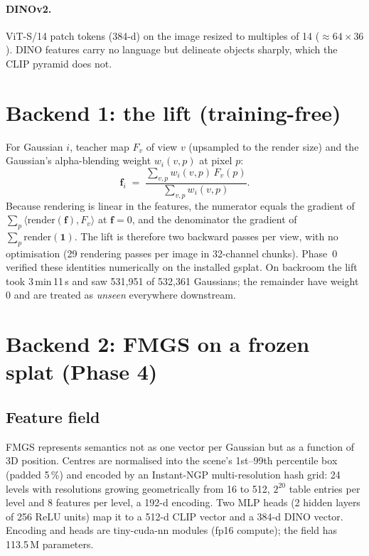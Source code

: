\documentclass[11pt,a4paper]{article}
\newcommand{\vect}[1]{\mathbf{#1}}
\begin{document}
\paragraph{DINOv2.} ViT-S/14 patch tokens (384-d) on the image resized to multiples of 14 ($\approx 64\times36$).
DINO features carry no language but delineate objects sharply, which the CLIP pyramid does not.

\section{Backend 1: the lift (training-free)}

For Gaussian $i$, teacher map $F_v$ of view $v$ (upsampled to the render size) and the Gaussian's alpha-blending
weight $w_i(v,p)$ at pixel $p$:
\begin{equation}
  \vect{f}_i \;=\; \frac{\sum_{v,p} w_i(v,p)\, F_v(p)}{\sum_{v,p} w_i(v,p)} .
\end{equation}
Because rendering is linear in the features, the numerator equals the gradient of
$\sum_p \langle \mathrm{render}(\vect{f}), F_v\rangle$ at $\vect{f}=0$, and the denominator the gradient of
$\sum_p \mathrm{render}(\vect{1})$. The lift is therefore two backward passes per view, with no optimisation
(29 rendering passes per image in 32-channel chunks). Phase~0 verified these identities numerically on the
installed gsplat. On backroom the lift took 3\,min\,11\,s and saw 531{,}951 of 532{,}361 Gaussians; the
remainder have weight 0 and are treated as \emph{unseen} everywhere downstream.

\section{Backend 2: FMGS on a frozen splat (Phase 4)}

\subsection{Feature field}
FMGS represents semantics not as one vector per Gaussian but as a function of 3D position. Centres are
normalised into the scene's 1st--99th percentile box (padded 5\,\%) and encoded by an Instant-NGP multi-resolution
hash grid: 24 levels with resolutions growing geometrically from 16 to 512, $2^{20}$ table entries per level and 8
features per level, a 192-d encoding. Two MLP heads (2 hidden layers of 256 ReLU units) map it to a 512-d CLIP
vector and a 384-d DINO vector. Encoding and heads are tiny-cuda-nn modules (fp16 compute); the field has
113.5\,M parameters.
\end{document}
